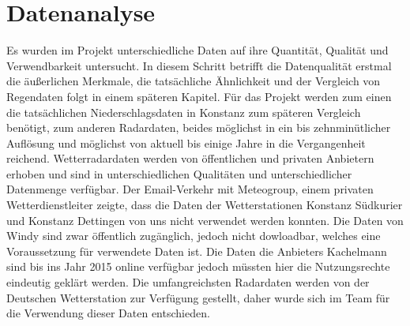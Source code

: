\section{Datenanalyse}
Es wurden im Projekt unterschiedliche Daten auf ihre Quantität, Qualität und Verwendbarkeit untersucht. In diesem Schritt betrifft die Datenqualität erstmal die äußerlichen Merkmale, die tatsächliche Ähnlichkeit und der Vergleich von Regendaten folgt in einem späteren Kapitel. 
Für das Projekt werden zum einen die tatsächlichen Niederschlagsdaten in Konstanz zum späteren Vergleich benötigt, zum anderen Radardaten, beides möglichst in ein bis zehnminütlicher Auflösung und möglichst von aktuell bis einige Jahre in die Vergangenheit reichend. 
Wetterradardaten werden von öffentlichen und privaten Anbietern erhoben und sind in unterschiedlichen Qualitäten und unterschiedlicher Datenmenge verfügbar. Der Email-Verkehr mit Meteogroup, einem privaten Wetterdienstleiter zeigte, dass die Daten der Wetterstationen Konstanz Südkurier und Konstanz Dettingen von uns nicht verwendet werden konnten. Die Daten von Windy sind zwar öffentlich zugänglich, jedoch nicht dowloadbar, welches eine Voraussetzung für verwendete Daten ist. Die Daten die Anbieters Kachelmann sind bis ins Jahr 2015 online verfügbar jedoch müssten hier die Nutzungsrechte eindeutig geklärt werden. 
Die umfangreichsten Radardaten werden von der Deutschen Wetterstation zur Verfügung gestellt, daher wurde sich im Team für die Verwendung dieser Daten entschieden. 

